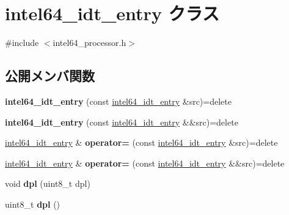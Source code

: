 \hypertarget{classintel64__idt__entry}{}\section{intel64\+\_\+idt\+\_\+entry クラス}
\label{classintel64__idt__entry}


{\ttfamily \#include $<$intel64\+\_\+processor.\+h$>$}

\subsection*{公開メンバ関数}
\begin{DoxyCompactItemize}
\item 
\hypertarget{classintel64__idt__entry_a9807a01902efadb7e54be2772b844f69}{}{\bfseries intel64\+\_\+idt\+\_\+entry} (const \hyperlink{classintel64__idt__entry}{intel64\+\_\+idt\+\_\+entry} \&src)=delete\label{classintel64__idt__entry_a9807a01902efadb7e54be2772b844f69}

\item 
\hypertarget{classintel64__idt__entry_adddc31fcd79f148babda0d866db0cf47}{}{\bfseries intel64\+\_\+idt\+\_\+entry} (const \hyperlink{classintel64__idt__entry}{intel64\+\_\+idt\+\_\+entry} \&\&src)=delete\label{classintel64__idt__entry_adddc31fcd79f148babda0d866db0cf47}

\item 
\hypertarget{classintel64__idt__entry_ad9f42b19a6d71b708afa406478c0754b}{}\hyperlink{classintel64__idt__entry}{intel64\+\_\+idt\+\_\+entry} \& {\bfseries operator=} (const \hyperlink{classintel64__idt__entry}{intel64\+\_\+idt\+\_\+entry} \&src)=delete\label{classintel64__idt__entry_ad9f42b19a6d71b708afa406478c0754b}

\item 
\hypertarget{classintel64__idt__entry_a8f06154d5008db370f39a63600ed71a7}{}\hyperlink{classintel64__idt__entry}{intel64\+\_\+idt\+\_\+entry} \& {\bfseries operator=} (const \hyperlink{classintel64__idt__entry}{intel64\+\_\+idt\+\_\+entry} \&\&src)=delete\label{classintel64__idt__entry_a8f06154d5008db370f39a63600ed71a7}

\item 
\hypertarget{classintel64__idt__entry_a44cf26db49c8d748b0a938c917f92cfb}{}void {\bfseries dpl} (uint8\+\_\+t dpl)\label{classintel64__idt__entry_a44cf26db49c8d748b0a938c917f92cfb}

\item 
\hypertarget{classintel64__idt__entry_a249c62d8f138cfeffa4a076aebca7a09}{}uint8\+\_\+t {\bfseries dpl} ()\label{classintel64__idt__entry_a249c62d8f138cfeffa4a076aebca7a09}


\end{DoxyCompactItemize}
